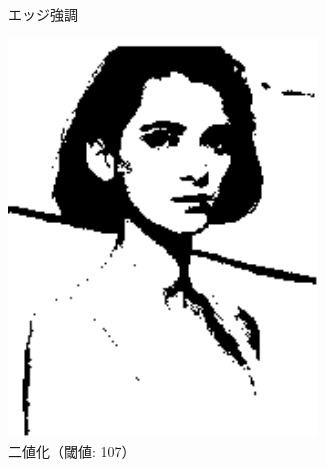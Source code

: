 \documentclass[a4paper,12pt]{jsarticle}
\begin{document}
\begin{figure}[!htbp]
\begin{subfigure}[b]{0.45\textwidth}
    \caption{エッジ強調}
\end{subfigure}

\begin{subfigure}[b]{0.45\textwidth}
    \centering
    \includegraphics[width=0.9\textwidth]{./images/binarized_sample7_binary.png}
    \caption{二値化（閾値: 107）}
\end{subfigure}
\hfill
\begin{subfigure}[b]{0.45\textwidth}
    \centering

\end{subfigure}
\end{figure}
\end{document}
